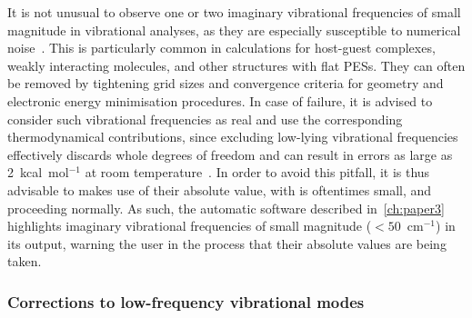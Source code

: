 It is not unusual to observe one or two imaginary vibrational frequencies of small magnitude in vibrational analyses,
as they are especially susceptible to numerical noise~\cite{Jensen_2015}.
This is particularly common in calculations for host-guest complexes,
weakly interacting molecules,
and other structures with flat PESs.
They can often be removed by tightening grid sizes and convergence criteria for geometry and electronic energy minimisation procedures.
In case of failure,
it is advised to consider such vibrational frequencies as real and use the corresponding thermodynamical contributions,
since excluding low-lying vibrational frequencies effectively discards whole degrees of freedom
and can result in errors as large as 2~kcal~mol$^{-1}$ at room temperature~\cite{Jensen_2015}.
In order to avoid this pitfall,
it is thus advisable to
makes use of their absolute value,
with is oftentimes small,
and proceeding normally.
As such,
the automatic software described in~\cref{ch:paper3}
highlights imaginary vibrational frequencies of small magnitude ($< 50$~cm$^{-1}$) in its output,
warning the user in the process that their absolute values are being taken.

\subsubsection{Corrections to low-frequency vibrational modes}%
\label{sec:quasi-rrho}

